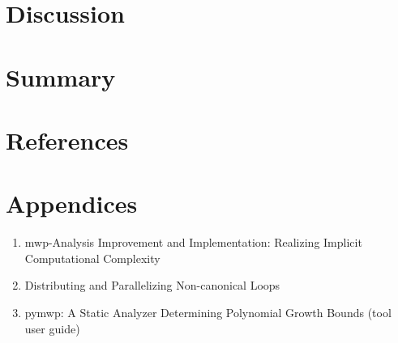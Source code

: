 \documentclass[letterpaper,11pt]{article}
\begin{document}


\section{Discussion}\label{sec:discussion}

\section{Summary}\label{sec:summary}

\section{References}\label{sec:references}
\printbibliography[heading=none,sorting=none]

\section{Appendices}\label{sec:appendices}
\begin{enumerate}[label=\Alph*.]
\item mwp-Analysis Improvement and Implementation: Realizing Implicit Computational Complexity
\item Distributing and Parallelizing Non-canonical Loops
\item pymwp: A Static Analyzer Determining Polynomial Growth Bounds (tool user guide)
\end{enumerate}



\end{document}
